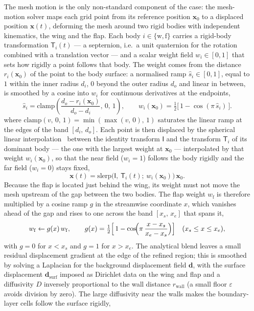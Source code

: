 The mesh motion is the only non-standard component of the case: the mesh-motion solver maps each grid point from its reference position $\mathbf x_0$ to a displaced position $\mathbf x(t)$, deforming the mesh around two rigid bodies with independent kinematics, the wing and the flap. Each body $i\in\{\mathrm w,\mathrm f\}$ carries a rigid-body transformation $\mathsf T_i(t)$ --- a septernion, i.e.\ a unit quaternion for the rotation combined with a translation vector --- and a scalar weight field $w_i\in[0,1]$ that sets how rigidly a point follows that body. The weight comes from the distance $r_i(\mathbf x_0)$ of the point to the body surface: a normalised ramp $\hat s_i\in[0,1]$, equal to $1$ within the inner radius $d_i$, $0$ beyond the outer radius $d_o$ and linear in between, is smoothed by a cosine into $w_i$ for continuous derivatives at the endpoints,
\begin{equation}
    \hat s_i = \mathrm{clamp}\!\left(\frac{d_o - r_i(\mathbf x_0)}{d_o - d_i},\,0,\,1\right),
    \qquad
    w_i(\mathbf x_0) = \tfrac12\bigl[\,1 - \cos(\pi\,\hat s_i)\,\bigr].
    \label{eq:slerp-weight}
\end{equation}
where $\mathrm{clamp}(v,\,0,\,1) = \min(\max(v,\,0),\,1)$ saturates the linear ramp at the edges of the band $[d_i,\,d_o]$. Each point is then displaced by the spherical linear interpolation~\cite{shoemake1985animating} between the identity transform $\mathsf I$ and the transform $\mathsf T_i$ of its dominant body --- the one with the largest weight at $\mathbf x_0$ --- interpolated by that weight $w_i(\mathbf x_0)$, so that the near field ($w_i = 1$) follows the body rigidly and the far field ($w_i = 0$) stays fixed,
\begin{equation}
    \mathbf x(t) = \mathrm{slerp}\bigl(\mathsf I,\ \mathsf T_i(t);\ w_i(\mathbf x_0)\bigr)\,\mathbf x_0 .
    \label{eq:slerp}
\end{equation}
Because the flap is located just behind the wing, its weight must not move the mesh upstream of the gap between the two bodies. The flap weight $w_{\mathrm f}$ is therefore multiplied by a cosine ramp $g$ in the streamwise coordinate $x$, which vanishes ahead of the gap and rises to one across the band $[x_s,\,x_e]$ that spans it,
\begin{equation}
    w_{\mathrm f} \leftarrow g(x)\,w_{\mathrm f},
    \qquad
    g(x) = \tfrac12\Bigl[\,1 - \cos\!\Bigl(\pi\,\frac{x - x_s}{x_e - x_s}\Bigr)\Bigr]
    \quad (x_s \le x \le x_e),
    \label{eq:gap-ramp}
\end{equation}
with $g = 0$ for $x < x_s$ and $g = 1$ for $x > x_e$. The analytical blend leaves a small residual displacement gradient at the edge of the refined region; this is smoothed by solving a Laplacian for the background displacement field $\mathbf d$, with the surface displacement $\mathbf d_{\mathrm{surf}}$ imposed as Dirichlet data on the wing and flap and a diffusivity $D$ inversely proportional to the wall distance $r_{\mathrm{wall}}$ (a small floor $\varepsilon$ avoids division by zero). The large diffusivity near the walls makes the boundary-layer cells follow the surface rigidly,
